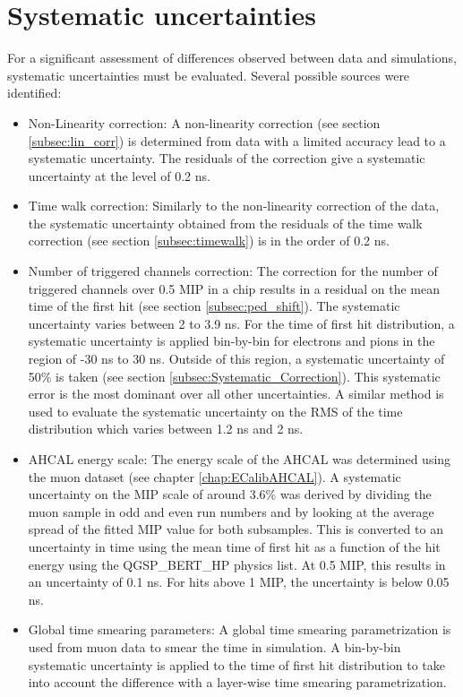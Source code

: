 \section{Systematic uncertainties}

For a significant assessment of differences observed between data and simulations, systematic uncertainties must be evaluated. Several possible sources were identified:

\begin{itemize}
	\item Non-Linearity correction: A non-linearity correction (see section \ref{subsec:lin_corr}) is determined from data with a limited accuracy lead to a systematic uncertainty. The residuals of the correction give a systematic uncertainty at the level of 0.2 ns.
	\item Time walk correction: Similarly to the non-linearity correction of the data, the systematic uncertainty obtained from the residuals of the time walk correction (see section \ref{subsec:timewalk}) is in the order of 0.2 ns.
	\item Number of triggered channels correction: The correction for the number of triggered channels over 0.5 MIP in a chip results in a residual on the mean time of the first hit (see section \ref{subsec:ped_shift}). The systematic uncertainty varies between 2 to 3.9 ns. For the time of first hit distribution, a systematic uncertainty is applied bin-by-bin for electrons and pions in the region of -30 ns to 30 ns. Outside of this region, a systematic uncertainty of 50\% is taken (see section \ref{subsec:Systematic_Correction}). This systematic error is the most dominant over all other uncertainties. A similar method is used to evaluate the systematic uncertainty on the RMS of the time distribution which varies between 1.2 ns and 2 ns.
	\item AHCAL energy scale: The energy scale of the AHCAL was determined using the muon dataset (see chapter \ref{chap:ECalibAHCAL}). A systematic uncertainty on the MIP scale of around 3.6\% was derived by dividing the muon sample in odd and even run numbers and by looking at the average spread of the fitted MIP value for both subsamples. This is converted to an uncertainty in time using the mean time of first hit as a function of the hit energy using the QGSP\_BERT\_HP physics list. At 0.5 MIP, this results in an uncertainty of 0.1 ns. For hits above 1 MIP, the uncertainty is below 0.05 ns.
	\item Global time smearing parameters: A global time smearing parametrization is used from muon data to smear the time in simulation. A bin-by-bin systematic uncertainty is applied to the time of first hit distribution to take into account the difference with a layer-wise time smearing parametrization.

\end{itemize}
